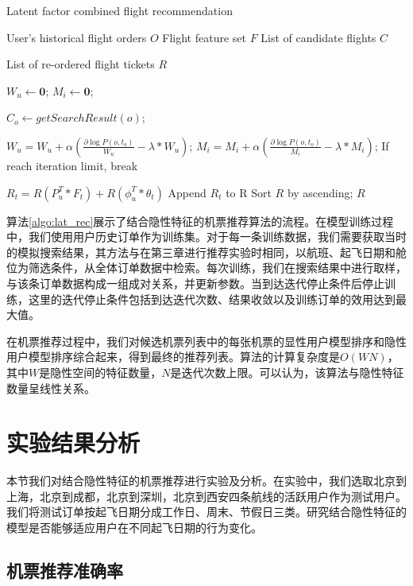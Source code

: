 \begin{algorithm}
\caption{Latent factor combined flight recommendation}
\label{algo:lat_rec}
\begin{algorithmic}[1]
\Require
\Statex User's historical flight orders $O$
\Statex Flight feature set $F$
\Statex List of candidate flights $C$

\Ensure 
\Statex List of re-ordered flight tickets $R$

\State $W_u \gets \mathbf{0}$;
\State $M_i \gets \mathbf{0}$;


\State $C_o \gets getSearchResult(o)$;

\State $W_u = W_u + \alpha(\frac{\partial \log P(o,t_o)}{W_u} - \lambda*W_u)$;
\State $M_i = M_i + \alpha(\frac{\partial \log P(o,t_o)}{M_i} - \lambda*M_i)$;
\EndFor
\State If reach iteration limit, break
\EndFor

\State $R_t = R(P_u^T * F_t) + R(\phi_u^T * \theta_t)$
\State Append $R_t$ to R
\EndFor 
\State Sort $R$ by ascending;
\State \Return $R$
\end{algorithmic}
\end{algorithm}

算法\ref{algo:lat_rec}展示了结合隐性特征的机票推荐算法的流程。在模型训练过程中，我们使用用户历史订单作为训练集。对于每一条训练数据，我们需要获取当时的模拟搜索结果，其方法与在第三章进行推荐实验时相同，以航班、起飞日期和舱位为筛选条件，从全体订单数据中检索。每次训练，我们在搜索结果中进行取样，与该条订单数据构成一组成对关系，并更新参数。当到达迭代停止条件后停止训练，这里的迭代停止条件包括到达迭代次数、结果收敛以及训练订单的效用达到最大值。

在机票推荐过程中，我们对候选机票列表中的每张机票的显性用户模型排序和隐性用户模型排序综合起来，得到最终的推荐列表。算法的计算复杂度是$O(WN)$，其中$W$是隐性空间的特征数量，$N$是迭代次数上限。可以认为，该算法与隐性特征数量呈线性关系。


\section{实验结果分析}

本节我们对结合隐性特征的机票推荐进行实验及分析。在实验中，我们选取北京到上海，北京到成都，北京到深圳，北京到西安四条航线的活跃用户作为测试用户。我们将测试订单按起飞日期分成工作日、周末、节假日三类。研究结合隐性特征的模型是否能够适应用户在不同起飞日期的行为变化。

\subsection{机票推荐准确率}

